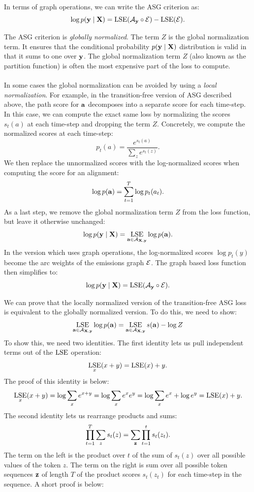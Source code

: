 In terms of graph operations, we can write the ASG criterion as:
\begin{equation}
    \label{eq:asg_graph_loss}
    \log p({\bf y} \mid {\bf X}) = \operatorname*{\textrm{LSE}}(\mathcal{A}_{\bf y} \circ \mathcal{E}) - \operatorname*{\textrm{LSE}}(\mathcal{E}).
\end{equation}

\begin{tcolorbox}[breakable, colback=white!95!black, colframe=white!45!black,
    sharp corners=all, title=Global or Local Normalization]

The ASG criterion is \emph{globally normalized}. The term $Z$ is the global
normalization term. It ensures that the conditional probability $p({\bf y} \mid
{\bf X})$ distribution is valid in that it sums to one over ${\bf y}$. The global
normalization term $Z$ (also known as the partition function) is often the
most expensive part of the loss to compute.
\\
\\
In some cases the global normalization can be avoided by using a \emph{local
normalization}. For example, in the transition-free version of ASG
described above, the path score for ${\bf a}$ decomposes into a separate score
for each time-step. In this case, we can compute the exact same loss by
normalizing the scores $s_t(a)$ at each time-step and dropping the term
$Z$. Concretely, we compute the normalized scores at each time-step:
$$
p_t(a) = \frac{e^{s_t(a)}}{\sum_z e^{s_t(z)}}.
$$
We then replace the unnormalized scores with the log-normalized scores when
computing the score for an alignment:
$$
\log p({\bf a}) = \sum_{t=1}^T \log p_t(a_t).
$$
As a last step, we remove the global normalization term $Z$ from the loss
function, but leave it otherwise unchanged:
$$
\log p({\bf y} \mid {\bf X}) = \operatorname*{\textrm{LSE}}_{{\bf a} \in \mathcal{A}_{{\bf X}, {\bf y}}} \log p({\bf a}).
$$
In the version which uses graph operations, the log-normalized scores $\log
p_t(y)$ become the arc weights of the emissions graph $\mathcal{E}$. The graph
based loss function then simplifies to:
$$
\log p({\bf y} \mid {\bf X}) = \operatorname*{\textrm{LSE}}(\mathcal{A}_{\bf y} \circ \mathcal{E}).
$$

We can prove that the locally normalized version of the transition-free ASG loss is equivalent to the globally normalized version. To do this, we need to show:
\begin{equation}
\label{eq:local_global}
\operatorname*{\textrm{LSE}}_{{\bf a} \in \mathcal{A}_{{\bf X}, {\bf y}}} \log p({\bf a}) = \operatorname*{\textrm{LSE}}_{{\bf a} \in \mathcal{A}_{{\bf X}, {\bf y}}} s({\bf a}) - \log Z
\end{equation}
To show this, we need two identities. The first identity lets us pull
independent terms out of the $\operatorname*{\textrm{LSE}}$ operation:
$$
\operatorname*{\textrm{LSE}}_x(x + y) = \operatorname*{\textrm{LSE}}(x) + y.
$$
The proof of this identity is below:
$$
\operatorname*{\textrm{LSE}}_x (x + y) = \log \sum_x e^{x+y} = \log \sum_x e^x e^y = \log \sum_x e^x + \log e^y = \operatorname*{\textrm{LSE}}(x) + y.
$$
The second identity lets us rearrange products and sums:
$$
\prod_{t=1}^T \sum_{z} s_t(z) = \sum_{\bf z} \prod_{t=1}^t s_t(z_t).
$$
The term on the left is the product over $t$ of the sum of $s_t(z)$ over all
possible values of the token $z$. The term on the right is sum over all
possible token sequences ${\bf z}$ of length $T$ of the product scores
$s_t(z_t)$ for each time-step in the sequence. A short proof is below:


\end{tcolorbox}
